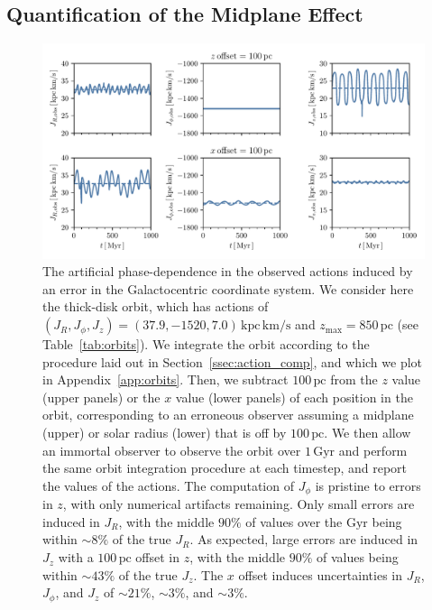\documentclass[twocolumn]{aastex62}
\newcommand{\pc}{\text{pc}}
\newcommand{\Gyr}{\text{Gyr}}
\newcommand{\kms}{\text{km}/\text{s}}
\newcommand{\actunit}{\text{kpc}\,\kms}
\begin{document}
\subsection{Quantification of the Midplane Effect} \label{ssec:quant}

\begin{figure}[ht!]
\begin{center}
\includegraphics[width=\textwidth]{fig/schmactions_one_orbit.pdf}
\end{center}
\caption{The artificial phase-dependence in the observed actions induced by an
error in the Galactocentric coordinate system. We consider here the thick-disk
orbit, which has actions of $(J_R, J_{\phi}, J_z) = (37.9, -1520,
7.0)\,\actunit$ and $z_{\text{max}}=850\,\pc$ (see Table~\ref{tab:orbits}). We
integrate the orbit according to the procedure laid out in
Section~\ref{ssec:action_comp}, and which we plot in
Appendix~\ref{app:orbits}. Then, we subtract $100\,\pc$ from the $z$ value
(upper panels) or the $x$ value (lower panels) of each position in the orbit,
corresponding to an erroneous observer assuming a midplane (upper) or solar
radius (lower) that is off by $100\,\pc$. We then allow an immortal observer
to observe the orbit over $1\,\Gyr$ and perform the same orbit integration
procedure at each timestep, and report the values of the actions. The
computation of $J_{\phi}$ is pristine to errors in $z$, with only numerical
artifacts remaining. Only small errors are induced in $J_R$, with the middle
$90\%$ of values over the $\Gyr$ being within $\sim8\%$ of the true $J_R$. As
expected, large errors are induced in $J_z$ with a $100\,\pc$ offset in $z$,
with the middle $90\%$ of values being within $\sim43\%$ of the true $J_z$.
The $x$ offset induces uncertainties in $J_R$, $J_{\phi}$, and $J_z$ of
$\sim21\%$, $\sim3\%$, and $\sim3\%$.}
\label{fig:one_orbit_wrong_ref}
\end{figure}
\end{document}

